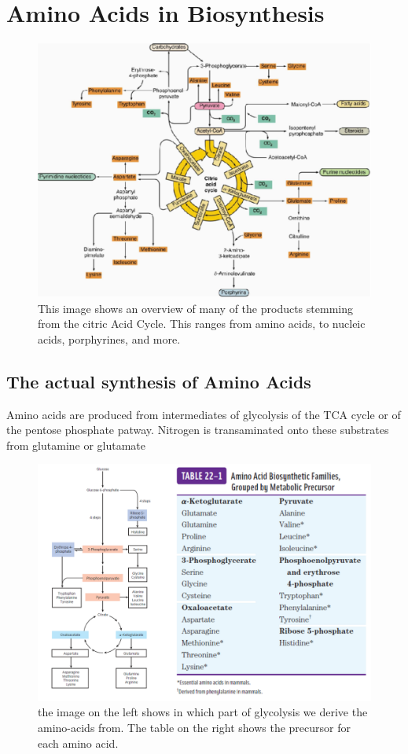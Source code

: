 \documentclass[../main.tex]{subfiles}
\begin{document}
	
\section{Amino Acids in Biosynthesis}

\begin{figure}[H]
	\centering
	\includegraphics[width=0.7\linewidth]{Overview}
	\caption{This image shows an overview of many of the products stemming from the citric Acid Cycle. This ranges from amino acids, to nucleic acids, porphyrines, and more.}
	\label{fig:overview}
\end{figure}


\subsection{The actual synthesis of Amino Acids}

Amino acids are produced from intermediates of glycolysis of the TCA cycle or of the pentose phosphate patway. Nitrogen is transaminated onto these substrates from glutamine or glutamate

\begin{figure}
	\centering
	\includegraphics[width=0.7\linewidth]{amino_overview}
	\caption{the image on the left shows in which part of glycolysis we derive the amino-acids from. The table on the right shows the precursor for each amino acid.}
	\label{fig:aminooverview}
\end{figure}
\end{document}
